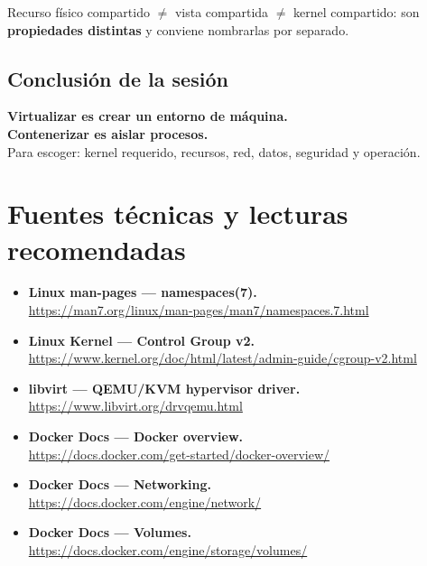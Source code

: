 \documentclass[11pt,a4paper]{article}
\begin{document}
\begin{clave}
Recurso físico compartido $\neq$ vista compartida $\neq$ kernel compartido:
son \textbf{propiedades distintas} y conviene nombrarlas por separado.
\end{clave}

\subsection*{Conclusión de la sesión}

\begin{tcolorbox}[enhanced, colback=azulprof, colframe=azulprof, arc=3pt,
  left=14pt,right=14pt,top=12pt,bottom=12pt]
{\color{white}\large\bfseries Virtualizar es crear un entorno de máquina.\\
Contenerizar es aislar procesos.}\\[6pt]
{\color{white!80!azulmedio}\small Para escoger: kernel requerido, recursos, red, datos,
seguridad y operación.}
\end{tcolorbox}

\section*{Fuentes técnicas y lecturas recomendadas}

\begin{itemize}[leftmargin=1.2em]
  \item \textbf{Linux man-pages — namespaces(7).}\\ \url{https://man7.org/linux/man-pages/man7/namespaces.7.html}
  \item \textbf{Linux Kernel — Control Group v2.}\\ \url{https://www.kernel.org/doc/html/latest/admin-guide/cgroup-v2.html}
  \item \textbf{libvirt — QEMU/KVM hypervisor driver.}\\ \url{https://www.libvirt.org/drvqemu.html}
  \item \textbf{Docker Docs — Docker overview.}\\ \url{https://docs.docker.com/get-started/docker-overview/}
  \item \textbf{Docker Docs — Networking.}\\ \url{https://docs.docker.com/engine/network/}
  \item \textbf{Docker Docs — Volumes.}\\ \url{https://docs.docker.com/engine/storage/volumes/}
\end{itemize}
\end{document}
